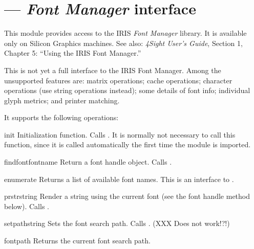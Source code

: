 \section{ ---
         \emph{Font Manager} interface}



This module provides access to the IRIS \emph{Font Manager} library.
It is available only on Silicon Graphics machines.
See also: \emph{4Sight User's Guide}, Section 1, Chapter 5: ``Using
the IRIS Font Manager.''

This is not yet a full interface to the IRIS Font Manager.
Among the unsupported features are: matrix operations; cache
operations; character operations (use string operations instead); some
details of font info; individual glyph metrics; and printer matching.

It supports the following operations:

\begin{funcdesc}{init}{}
Initialization function.
Calls .
It is normally not necessary to call this function, since it is called
automatically the first time the  module is imported.
\end{funcdesc}

\begin{funcdesc}{findfont}{fontname}
Return a font handle object.
Calls .
\end{funcdesc}

\begin{funcdesc}{enumerate}{}
Returns a list of available font names.
This is an interface to .
\end{funcdesc}

\begin{funcdesc}{prstr}{string}
Render a string using the current font (see the  font
handle method below).
Calls .
\end{funcdesc}

\begin{funcdesc}{setpath}{string}
Sets the font search path.
Calls .
(XXX Does not work!?!)
\end{funcdesc}

\begin{funcdesc}{fontpath}{}
Returns the current font search path.
\end{funcdesc}

